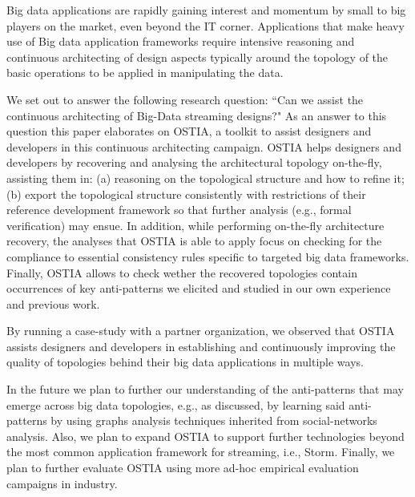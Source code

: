 Big data applications are rapidly gaining interest and momentum by small to big players on the market, even beyond the IT corner. Applications that make heavy use of Big data application frameworks require intensive reasoning and continuous architecting of design aspects typically around the topology of the basic operations to be applied in manipulating the data. 

We set out to answer the following research question: ``Can we assist the continuous architecting of Big-Data streaming designs?" As an answer to this question this paper elaborates on OSTIA, a toolkit to assist designers and developers in this continuous architecting campaign. OSTIA helps designers and developers by recovering and analysing the architectural topology on-the-fly, assisting them in: (a) reasoning on the topological structure and how to refine it; (b) export the topological structure consistently with restrictions of their reference development framework so that further analysis (e.g., formal verification) may ensue. In addition, while performing on-the-fly architecture recovery, the analyses that OSTIA is able to apply focus on checking for the compliance to essential consistency rules specific to targeted big data frameworks. Finally, OSTIA allows to check wether the recovered topologies contain occurrences of key anti-patterns we elicited and studied in our own experience and previous work. 

By running a case-study with a partner organization, we observed that OSTIA assists designers and developers in establishing and continuously improving the quality of topologies behind their big data applications in multiple ways.
 
In the future we plan to further our understanding of the anti-patterns that may emerge across big data topologies, e.g., as discussed, by learning said anti-patterns by using graphs analysis techniques inherited from social-networks analysis. Also, we plan to expand OSTIA to support further technologies beyond the most common application framework for streaming, i.e., Storm. Finally, we plan to further evaluate OSTIA using more ad-hoc empirical evaluation campaigns in industry.